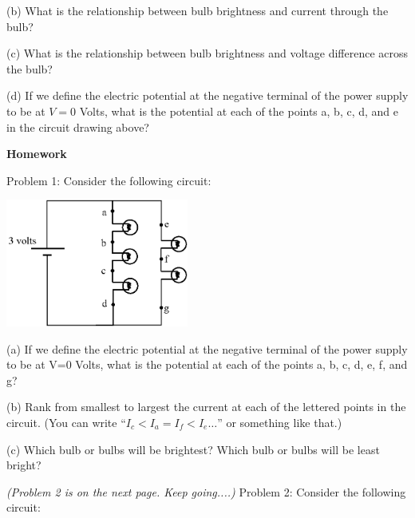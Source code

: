 (b) What is the relationship between bulb brightness and current through the bulb?
\vspace{0.5 in}

(c) What is the relationship between bulb brightness and voltage difference across the bulb?
\vspace{0.5 in}

\newpage
\begin{samepage} %
(d) If we define the electric potential at the negative terminal of the power supply to be at $V=0$ Volts, what is the potential at each of the points a, b, c, d, and e in the circuit drawing above?  
\vspace*{0.6 in}
\end{samepage}

\textbf{Homework}

Problem 1: Consider the following circuit:

\begin{center}
\includegraphics[width=0.45\textwidth]{electric_circuits/circ_diag6.eps}
\end{center}
\vspace{-0.1in}

(a) If we define the electric potential at the negative terminal of the power supply to be at V=0 Volts, what is the potential at each of the points a, b, c, d, e, f, and g?  
\vspace{0.7 in}

(b) Rank from smallest to largest the current at each of the lettered points in the circuit.   (You can write ``$I_c<I_a=I_f<I_e…$'' or something like that.) 
\vspace{0.7 in}

(c) Which bulb or bulbs will be brightest?  Which bulb or bulbs will be least bright?
\vspace{1.7 in}

\textit{(Problem 2 is on the next page.  Keep going....)}
\newpage
Problem 2: Consider the following circuit:

